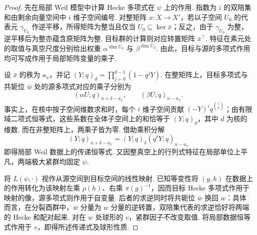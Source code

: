 \begin{proof}
先在局部 Weil 模型中计算 Hecke 多项式在 $\psi$ 上的作用. 指数为 $i$ 的双陪集和由剩余向量空间中 $i$ 维子空间编号. 对整矩阵 $x:X\to X'$，若以子空间 $U_0$ 的代表元 $\gamma_{U_0}$ 作逆平移，所得矩阵为整当且仅当 $U_0\subseteq\ker\bar x$；反之，由于 $\gamma_{U_0}$ 为整，逆平移后为整亦蕴含原矩阵为整. 目标群的计算则对应转置矩阵 $\bar x^\top$. 特征在素元处的取值与真空尺度分别给出权重 $\alpha^{\dim U_0}$ 与 $\beta^{\dim U_0}$. 由此，目标与源的多项式作用均可写成作用于局部矩阵变量的乘子.

设 $\bar x$ 的秩为 $a_x$，并记 $(Y;q)_d=\prod_{j=0}^{d-1}(1-q^jY)$. 在整矩阵上，目标多项式与共轭位 $\bar w$ 处的源多项式对应的乘子分别为
\[
 (\alpha U;q)_{n+\delta-a_x},\qquad
 (\beta U;q)_{n-a_x}.
\]
事实上，在核中按子空间维数求和时，每个 $i$ 维子空间贡献 $(-Y)^i q^{\binom i2}$；由有限域二项式恒等式，这些系数在全体子空间上的和恰等于 $(Y;q)_d$，其中 $d$ 为核的维数. 而在非整矩阵上，两乘子皆为零. 借助乘积分解
\[
 (Y;q)_{n+\delta-a_x}
   =(Y;q)_\delta(q^\delta Y;q)_{n-a_x}
\]
即得局部 Weil 数据上的传递恒等式. 又因整真空上的行列式特征在局部单位上平凡，两端极大紧群均固定 $\psi$.

将 $L(\psi,\cdot)$ 视作从源空间到目标空间的线性映射. 已知等变性将 $(g,h)$ 在数据上的作用转化为该映射左乘 $\rho(h)$、右乘 $\pi(g)^{-1}$，因而目标 Hecke 多项式作用于映射的像，源多项式则作用于自变量. 后者的求逆同时将共轭位 $\bar w$ 换回 $w$：具体而言，在分裂酉群中，$\bar w$ 分量为 $w$ 分量的逆转置，双陪集代表的求逆恰好将两端的 Hecke 和配对起来. 对在 $w$ 处球形的 $v$，紧群因子不改变取值. 将局部数据恒等式作用于 $v$，即得所述传递式及球形性质.
\end{proof}


